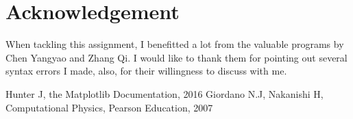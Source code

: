 \documentclass[10pt,a4paper]{article}
\begin{document}
	\section*{Acknowledgement}
	When tackling this assignment, I benefitted a lot from the valuable programs by Chen Yangyao and Zhang Qi. I would like to thank them for pointing out several syntax errors I made, also, for their willingness to discuss with me.
	
	\begin{thebibliography}{99}
		\bibitem{}Hunter J, the Matplotlib Documentation, 2016
		\bibitem{}Giordano N.J, Nakanishi H, Computational Physics, Pearson Education, 2007
	\end{thebibliography} 
\end{document}
